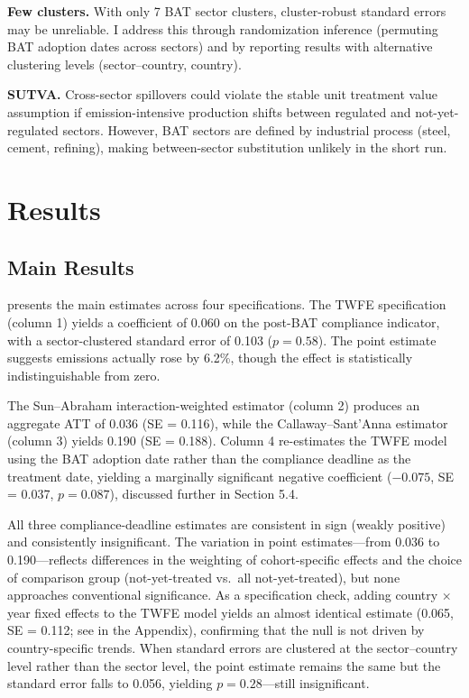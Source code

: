 \documentclass[12pt]{article}
\begin{document}
\textbf{Few clusters.} With only 7 BAT sector clusters, cluster-robust standard errors may be unreliable. I address this through randomization inference (permuting BAT adoption dates across sectors) and by reporting results with alternative clustering levels (sector--country, country).

\textbf{SUTVA.} Cross-sector spillovers could violate the stable unit treatment value assumption if emission-intensive production shifts between regulated and not-yet-regulated sectors. However, BAT sectors are defined by industrial process (steel, cement, refining), making between-sector substitution unlikely in the short run.


\section{Results}

\subsection{Main Results}

 presents the main estimates across four specifications. The TWFE specification (column 1) yields a coefficient of 0.060 on the post-BAT compliance indicator, with a sector-clustered standard error of 0.103 ($p = 0.58$). The point estimate suggests emissions actually rose by 6.2\%, though the effect is statistically indistinguishable from zero.

The Sun--Abraham interaction-weighted estimator (column 2) produces an aggregate ATT of 0.036 (SE = 0.116), while the Callaway--Sant'Anna estimator (column 3) yields 0.190 (SE = 0.188). Column 4 re-estimates the TWFE model using the BAT adoption date rather than the compliance deadline as the treatment date, yielding a marginally significant negative coefficient ($-0.075$, SE = 0.037, $p = 0.087$), discussed further in Section 5.4.

All three compliance-deadline estimates are consistent in sign (weakly positive) and consistently insignificant. The variation in point estimates---from 0.036 to 0.190---reflects differences in the weighting of cohort-specific effects and the choice of comparison group (not-yet-treated vs.\ all not-yet-treated), but none approaches conventional significance. As a specification check, adding country $\times$ year fixed effects to the TWFE model yields an almost identical estimate (0.065, SE = 0.112; see  in the Appendix), confirming that the null is not driven by country-specific trends. When standard errors are clustered at the sector--country level rather than the sector level, the point estimate remains the same but the standard error falls to 0.056, yielding $p = 0.28$---still insignificant.
\end{document}
